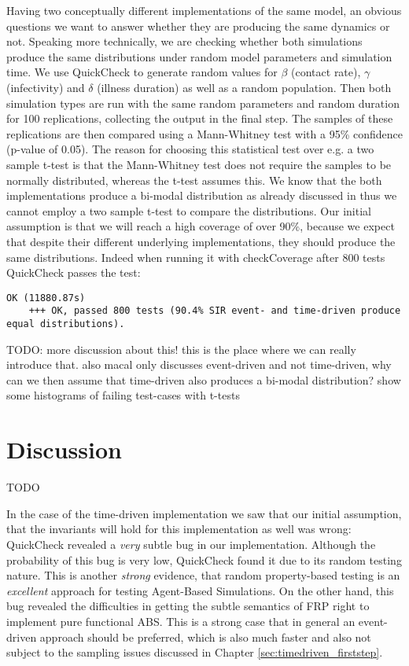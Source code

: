 Having two conceptually different implementations of the same model, an obvious questions we want to answer whether they are producing the same dynamics or not. Speaking more technically, we are checking whether both simulations produce the same distributions under random model parameters and simulation time. We use QuickCheck to generate random values for $\beta$ (contact rate), $\gamma$ (infectivity) and $\delta$ (illness duration) as well as a random population. Then both simulation types are run with the same random parameters and random duration for 100 replications, collecting the output in the final step. The samples of these replications are then compared using a Mann-Whitney test with a 95\% confidence (p-value of 0.05). The reason for choosing this statistical test over e.g. a two sample t-test is that the Mann-Whitney test does not require the samples to be normally distributed, whereas the t-test assumes this. We know that the both implementations produce a bi-modal distribution as already discussed in \cite{macal_agent-based_2010} thus we cannot employ a two sample t-test to compare the distributions.
Our initial assumption is that we will reach a high coverage of over 90\%, because we expect that despite their different underlying implementations, they should produce the same distributions. Indeed when running it with checkCoverage after 800 tests QuickCheck passes the test:

\begin{verbatim}
OK (11880.87s)
    +++ OK, passed 800 tests (90.4% SIR event- and time-driven produce equal distributions).
\end{verbatim}

TODO: more discussion about this! this is the place where we can really introduce that. also macal only discusses event-driven and not time-driven, why can we then assume that time-driven also produces a bi-modal distribution? show some histograms of failing test-cases with t-tests

\section{Discussion}
TODO

In the case of the time-driven implementation we saw that our initial assumption, that the invariants will hold for this implementation as well was wrong: QuickCheck revealed a \textit{very} subtle bug in our implementation. Although the probability of this bug is very low, QuickCheck found it due to its random testing nature. This is another \textit{strong} evidence, that random property-based testing is an \textit{excellent} approach for testing Agent-Based Simulations. On the other hand, this bug revealed the difficulties in getting the subtle semantics of FRP right to implement pure functional ABS. This is a strong case that in general an event-driven approach should be preferred, which is also much faster and also not subject to the sampling issues discussed in Chapter \ref{sec:timedriven_firststep}.